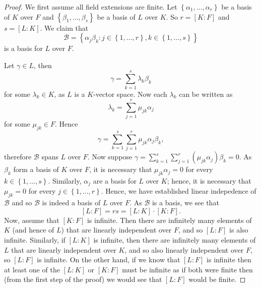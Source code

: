 \begin{proof}
	We first assume all field extensions are finite.
	Let $ \left\{ \alpha_1, \ldots, \alpha_r \right\} $
	be a basis of $K$ over $F$ and
	$ \left\{ \beta_1, \ldots, \beta_s \right\} $
	be a basis of $L$ over $K$.
	So $r = [K:F]$ and $s = [L:K]$.
	We claim that
	\[
		\mathcal B = \left\{
			\alpha_j \beta_k:
			j \in \left\{ 1, \ldots, r \right\},
			k \in \left\{ 1, \ldots, s \right\}
		\right\}
	\]
	is a basis for $L$ over $F$.

	Let $\gamma \in L$, then
	\[
		\gamma = \sum_{k=1}^s \lambda_k \beta_k
	\]
	for some $\lambda_k \in K$, as $L$ is a $K$-vector space.
	Now each $\lambda_k$ can be written as
	\[
		\lambda_k = \sum_{j=1}^r \mu_{jk}\alpha_j
	\]
	for some $\mu_{jk} \in F$.
	Hence
	\[
		\gamma = \sum_{k=1}^s
		\sum_{j=1}^r \mu_{jk} \alpha_j \beta_k,
	\]
	therefore $\mathcal B$ spans $L$ over $F$.
	Now suppose $
		\gamma 
		= \sum_{k=1}^s \sum_{j=1}^r \left(
			\mu_{jk} \alpha_j
		\right) \beta_k
		= 0
	$. 
	As $\beta_k$ form a basis of $K$ over $F$, it is necessary that
	$\mu_{jk} \alpha_j = 0$ for every $k \in \left\{ 1, \ldots, s \right\}$.
	Similarly, $\alpha_j$ are a basis for $L$ over $K$; hence,
	it is necessary that $\mu_{jk} = 0$ for every
	$j \in \left\{ 1, \ldots, r \right\}$.
	Hence, we have established linear indepedence of $\mathcal B$
	and so $\mathcal B$ is indeed a basis of $L$ over $F$.
	As $\mathcal B$ is a basis, we see that
	\[
		[L : F] = rs = [L:K] \cdot [K:F].
	\]
	Now, assume that $[K:F]$ is infinite.
	Then there are infinitely many elements of $K$
	(and hence of $L$) that are linearly independent over $F$,
	and so $[L:F]$ is also infinite.
	Similarly, if $[L:K]$ is infinite, then there are infinitely many elements
	of $L$ that are linearly independent over $K$,
	and so also linearly independent over $F$,
	so $[L:F]$ is infinite.
	On the other hand, if we know that $[L:F]$ is infinite
	then at least one of the $[L:K]$ or $[K:F]$ must be infinite
	as if both were finite then (from the first step of the proof)
	we would see that $[L:F]$ would be finite.
\end{proof}

